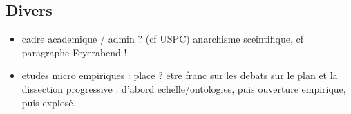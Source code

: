 \documentclass[11pt]{article}
\begin{document}
\subsection*{Divers}

\begin{itemize}
	\item cadre academique / admin ? (cf USPC) anarchisme sceintifique, cf paragraphe Feyerabend !
	\item etudes micro empiriques : place ? etre franc sur les debats sur le plan et la dissection progressive : d'abord echelle/ontologies, puis ouverture empirique, puis explosé.
\end{itemize}
\end{document}
